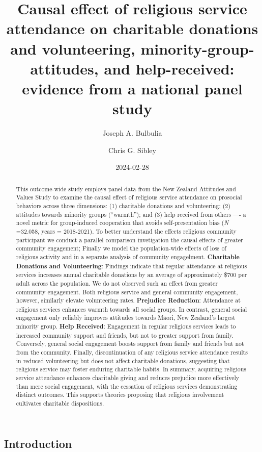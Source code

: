\documentclass[
  singlecolumn]{article}
\title{Causal effect of religious service attendance on charitable
donations and volunteering, minority-group-attitudes, and help-received:
evidence from a national panel study}
\author{Joseph A. Bulbulia \and Chris G. Sibley}
\date{2024-02-28}
\begin{document}
\maketitle
\begin{abstract}
This outcome-wide study employs panel data from the New Zealand
Attitudes and Values Study to examine the causal effect of religious
service attendance on prosocial behaviors across three dimensions: (1)
charitable donations and volunteering; (2) attitudes towards minority
groups (``warmth''); and (3) help received from others ---- a novel
metric for group-induced cooperation that avoids self-presentation bias
(\emph{N} =32.058, years = 2018-2021). To better understand the effects
religious community participant we conduct a parallel comparison
invetigation the causal effects of greater community engagement; Finally
we model the population-wide effects of loss of religious activity and
in a separate analysis of community engagelment. \textbf{Charitable
Donations and Volunteering}: Findings indicate that regular attendance
at religious services increases annual charitable donations by an
average of approximately \$700 per adult across the population. We do
not observed such an effect from greater community engagement. Both
religious service and general community engagement, however, similarly
elevate volunteering rates. \textbf{Prejudice Reduction}: Attendance at
religious services enhances warmth towards all social groups. In
contrast, general social engagement only reliably improves attitudes
towards Māori, New Zealand's largest minority group. \textbf{Help
Received}: Engagement in regular religious services leads to increased
community support and friends, but not to greater support from family.
Conversely, general social engagement boosts support from family and
friends but not from the community. Finally, discontinuation of any
religious service attendance results in reduced volunteering but does
not affect charitable donations, suggesting that religious service may
foster enduring charitable habits. In summary, acquiring religious
service attendance enhances charitable giving and reduces prejudice more
effectively than mere social engagement, with the cessation of religious
services demonstrating distinct outcomes. This supports theories
proposing that religious involvement cultivates charitable dispositions.
\end{abstract}

\subsection{Introduction}\label{introduction}
\end{document}
